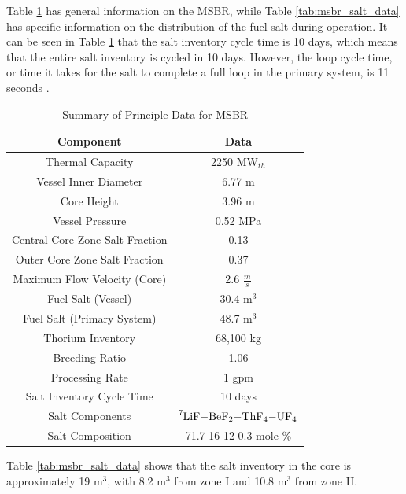 Table \ref{tab:msbr_gen_data} has general information on the MSBR, while Table \ref{tab:msbr_salt_data} has specific information on the distribution of the fuel salt during operation. It can be seen in Table \ref{tab:msbr_gen_data} that the salt inventory cycle time is 10 days, which means that the entire salt inventory is cycled in 10 days. However, the loop cycle time, or time it takes for the salt to complete a full loop in the primary system, is 11 seconds \cite{robertson_conceptual_1971}.

\begin{table}[H]
\renewcommand{\arraystretch}{1.25}
\caption{Summary of Principle Data for MSBR \cite{robertson_conceptual_1971}}
\label{tab:msbr_gen_data}
\begin{center}
\begin{tabular}{ c | c }
 \hline
 Component & Data\\
 \hline
 \hline
 Thermal Capacity & 2250 MW$_{th}$\\
 Vessel Inner Diameter & 6.77 m\\
 Core Height & 3.96 m\\
 Vessel Pressure & 0.52 MPa\\
 Central Core Zone Salt Fraction & 0.13\\
 Outer Core Zone Salt Fraction & 0.37\\
 Maximum Flow Velocity (Core) & 2.6 $\frac{m}{s}$\\
 Fuel Salt (Vessel) & 30.4 m$^3$\\
 Fuel Salt (Primary System) & 48.7 m$^3$\\
 Thorium Inventory & 68,100 kg\\
 Breeding Ratio & 1.06\\
 Processing Rate & 1 gpm\\
 Salt Inventory Cycle Time & 10 days\\
 Salt Components & $\ce{^{7}LiF-BeF_{2}-ThF_{4}-UF_{4}} $\\
 Salt Composition & 71.7-16-12-0.3 mole \% \\
 \hline
\end{tabular}
\end{center}
\end{table}

Table \ref{tab:msbr_salt_data} shows that the salt inventory in the core is approximately 19 m$^3$, with 8.2 m$^3$ from zone I and 10.8 m$^3$ from zone II.


